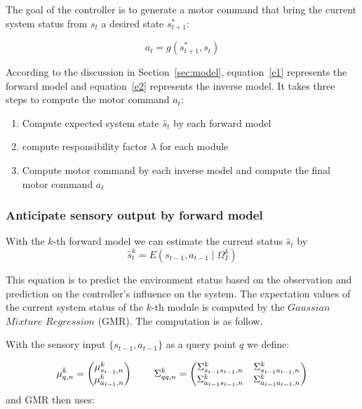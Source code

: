 \documentclass[preprint,12pt]{elsarticle}
\begin{document}
The goal of the controller is to generate a motor command that bring the current system status from $s_t$ a desired state $s^*_{t+1}$:

\begin{equation}
\label{e2}
a_t = g\left({s^*_{t+1},s_t}\right)
\end{equation}

According to the discussion in Section~\ref{sec:model}, equation~\ref{e1} represents the forward model and equation~\ref{e2} represents the inverse model. It takes three steps to compute the motor command $a_t$:
\begin{enumerate}
\item Compute expected system state $\hat{s}_t$ by each forward model
\item compute responsibility factor $\lambda$ for each module
\item Compute motor command by each inverse model and compute the final motor command $a_t$
\end{enumerate}


\subsubsection{Anticipate sensory output by forward model}
\label{sec:forward}
With the $k$-th forward model we can estimate the current status $\hat{s}_t$ by
\begin{equation}
\label{e3}
\hat{s}^k_{t} = E\left({s_{t-1}, a_{t-1} \mid \Omega^k_I}\right)
\end{equation}

%

This equation is to predict the environment status based on the observation and prediction on the controller's influence on the system. The expectation values of the current system status of the $k$-th module is computed by the $Gaussian$ $Mixture$ $Regression$ (GMR). The computation is as follow.

With the sensory input $\{s_{t-1},a_{t-1}\}$ as a query point $q$ we define:

\begin{equation}
{
 {\mu}_{q,n}^k = \begin{pmatrix} {\mu}_{s_{t-1},n}^k    \\
                                        {\mu}_{a_{t-1},n}^k
                        \end{pmatrix}
\hspace{0.3in}
{\Sigma}_{qq,n}^k =  \begin{pmatrix} {\Sigma}_{s_{t-1}s_{t-1},n}^k  & {\Sigma}_{s_{t-1}{a_{t-1},n}}^k  \\
                                            {\Sigma}_{{a_{t-1}}{s_{t-1}},n}^k  & {\Sigma}_{{a_{t-1}}{a_{t-1}},n}^k
                            \end{pmatrix}
}
\end{equation}
and GMR then uses:
\end{document}
